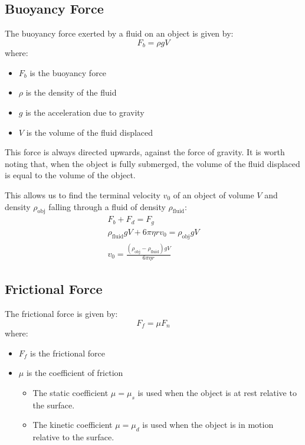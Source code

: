 \documentclass[a4paper,12pt]{article}
\begin{document}
\pagebreak

\subsection{Buoyancy Force}

The buoyancy force exerted by a fluid on an object is given by:
$$F_b = \rho g V$$
where:
\begin{itemize}
  \item $F_b$ is the buoyancy force
  \item $\rho$ is the density of the fluid
  \item $g$ is the acceleration due to gravity
  \item $V$ is the volume of the fluid displaced
\end{itemize}

This force is always directed upwards, against the force of gravity. It is worth noting that, when the object is fully submerged, the volume of the fluid displaced is equal to the volume of the object.

This allows us to find the terminal velocity $v_0$ of an object of volume $V$ and density $\rho_\text{obj}$ falling through a fluid of density $\rho_\text{fluid}$:
\begin{align*}
  F_b + F_d = F_g                                               \\
  \rho_\text{fluid} g V + 6\pi \eta r v_0 = \rho_\text{obj} g V \\
  v_0 = \frac{\left(\rho_\text{obj} - \rho_\text{fluid}\right) g V}{6\pi \eta r}
\end{align*}


\pagebreak

\subsection{Frictional Force}

The frictional force is given by:
$$F_f = \mu F_n$$
where:
\begin{itemize}
  \item $F_f$ is the frictional force
  \item $\mu$ is the coefficient of friction
        \begin{itemize}
          \item The static coefficient $\mu = \mu_s$ is used when the object is at rest relative to the surface.
          \item The kinetic coefficient $\mu = \mu_d$ is used when the object is in motion relative to the surface.
        \end{itemize}
\end{itemize}
\end{document}
